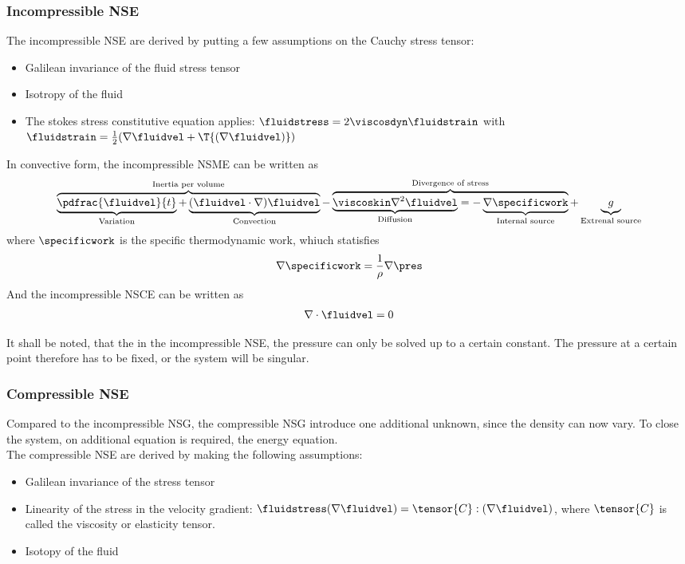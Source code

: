 \documentclass[../main.tex]{subfiles}
\begin{document}
\subsubsection{Incompressible \acl{NSE}}
The incompressible \ac{NSE} are derived by putting a few assumptions on the Cauchy stress tensor:
\begin{itemize}
\item Galilean invariance of the fluid stress tensor
\item Isotropy of the fluid
\item The stokes stress constitutive equation applies: $\fluidstress=2 \viscosdyn \fluidstrain$ with $\fluidstrain=\frac{1}{2}(\nabla \fluidvel+\T{(\nabla \fluidvel)})$
\end{itemize}

In convective form, the incompressible \ac{NSME} can be written as
\begin{align}\label{eq:nsg_incompressible}
\overbrace{
           \underbrace{\pdfrac{\fluidvel}{t}}_{\text{Variation}}  +
          \underbrace{(\fluidvel\cdot\nabla)\fluidvel}_{\text{Convection}}
          }^{\text{Inertia per volume}}
 -
\overbrace{
           \underbrace{\viscoskin\nabla^2\fluidvel}_{\text{Diffusion}} =
          -\underbrace{\nabla\specificwork}_{\text{Internal source}}
          }^{\text{Divergence of stress}}
+
\underbrace{g}_{\text{Extrenal source}}
\end{align}
where $\specificwork$ is the specific thermodynamic work, whiuch statisfies
\begin{align}
\nabla\specificwork =
\frac{1}{\rho}\nabla\pres
\end{align}
And the incompressible \ac{NSCE} can be written as
\begin{align}
\nabla\cdot\fluidvel=0
\end{align}

It shall be noted, that the in the incompressible \ac{NSE}, the pressure can only be solved up to a certain constant. The pressure at a certain point therefore has to be fixed, or the system will be singular.

\subsubsection{Compressible \acl{NSE}}\label{sec:nsg_compressible}
Compared to the incompressible \ac{NSG}, the compressible \ac{NSG} introduce one additional unknown, since the density can now vary. To close the system, on additional equation is required, the energy equation.\\
The compressible \ac{NSE} are derived by making the following assumptions:
\begin{itemize}
\item Galilean invariance of the stress tensor
\item Linearity of the stress in the velocity gradient: $\fluidstress(\nabla\fluidvel)=\tensor{C}:(\nabla\fluidvel)$, where $\tensor{C}$ is called the viscosity or elasticity tensor.
\item Isotopy of the fluid
\end{itemize}
\end{document}
